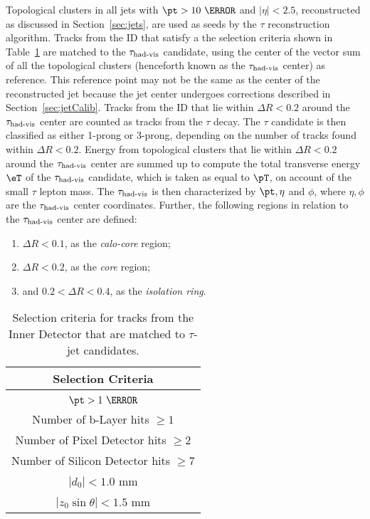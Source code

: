 \par Topological clusters in all jets with $\pt>10~\GeV$ and $|\eta|<2.5$, reconstructed as discussed in Section~\ref{sec:jets},
 are used as seeds by the $\tau$ reconstruction algorithm. Tracks from the ID that satisfy a 
the selection criteria shown in Table~\ref{tab:tautrkSel} are matched to the $\tau_{\text{had-vis}}$ candidate,  
using the center of the vector sum of all the topological 
clusters (henceforth known as the $\tau_{\text{had-vis}}$ center) as reference. This reference point 
may not be the same as the center of the reconstructed jet 
because the jet center undergoes corrections described in Section~\ref{sec:jetCalib}.
Tracks from the ID that lie within $\Delta R<0.2$ around the $\tau_{\text{had-vis}}$ center are counted 
as tracks from the $\tau$ decay. The $\tau$ candidate is then classified as either 1-prong 
or 3-prong, depending on the number of tracks found within $\Delta R<0.2$. 
Energy from topological clusters that lie within $\Delta R<0.2$ around the $\tau_{\text{had-vis}}$ center are summed up to compute the 
total transverse energy $\eT$ of the $\tau_{\text{had-vis}}$ candidate, which is taken as equal to $\pT$, on account 
of the small $\tau$ lepton mass. The 
$\tau_{\text{had-vis}}$ is then characterized by $\pt,\eta$ and $\phi$, where $\eta,\phi$ are 
the $\tau_{\text{had-vis}}$ center coordinates. 
Further, the following regions in relation to the $\tau_{\text{had-vis}}$ center are defined:

\begin{enumerate}
\item $\Delta R<0.1$, as the {\it calo-core} region;
\item $\Delta R<0.2$, as the {\it core} region;
\item and $0.2<\Delta R<0.4$, as the {\it isolation ring}.
\end{enumerate} 

\begin{table}[!h]
\centering
   \begin{tabular}{|c|}
\hline
{\bf Selection Criteria} \\
\hline\hline \\
$\pt>1~\GeV$ \\
Number of b-Layer hits $\geq 1$ \\
Number of Pixel Detector hits $\geq 2$ \\
Number of Silicon Detector hits $\geq 7$ \\
$|d_0|<1.0$ mm \\
$|z_0\sin\theta|< 1.5$ mm \\ 
\hline
   \end{tabular}
\caption{Selection criteria for tracks from the Inner Detector that are matched to $\tau$-jet candidates.}
\label{tab:tautrkSel}
\end{table}


